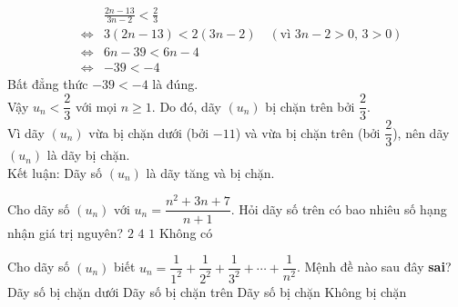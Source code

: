 \begin{ex}
{\begin{eqnarray*}
			&&  \frac{2n - 13}{3n - 2} < \frac{2}{3} \\[2pt]
			&\Leftrightarrow& 3(2n - 13) < 2(3n  - 2) \quad (\text{vì } 3n - 2 > 0,\, 3 > 0) \\[2pt]
			&\Leftrightarrow& 6n - 39 < 6n  - 4 \\[2pt]
			&\Leftrightarrow& -39 < -4 
		\end{eqnarray*}
		Bất đẳng thức $-39 < -4$ là  đúng.\\
		 Vậy $u_n < \dfrac{2}{3}$ với mọi $n \ge 1$.
		Do đó, dãy  $(u_n)$ bị chặn trên bởi $\dfrac{2}{3}$.\\
		Vì dãy $(u_n)$ vừa bị chặn dưới (bởi $-11$) và vừa bị chặn trên (bởi $\dfrac{2}{3}$), nên dãy  $(u_n)$ là dãy bị chặn.\\
		Kết luận: Dãy số $(u_n)$ là dãy tăng và  bị chặn.
	 }
\end{ex}

\begin{ex}%
	Cho dãy số $(u_n)$  với $u_n=\dfrac{n^2+3n+7}{n+1}$. Hỏi dãy số trên có bao nhiêu số hạng nhận giá trị nguyên?
	 \choice
		{$2$} 
		{$4$} 
		{\True  $1$}
		{Không có} 
\end{ex}

\begin{ex}%
	Cho dãy số $(u_n)$ biết $u_n = \dfrac{1}{1^2} + \dfrac{1}{2^2} + \dfrac{1}{3^2} + \cdots + \dfrac{1}{n^2}$. Mệnh đề nào sau  đây \textbf{sai}?
	\choice 
		{Dãy số bị chặn dưới} 
		{Dãy  số bị chặn trên}
		{Dãy  số bị chặn}
		{\True Không bị  chặn}
\end{ex}

